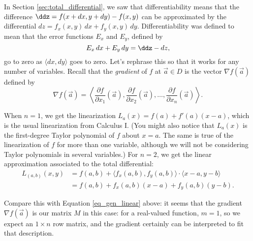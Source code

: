 In Section \ref{sec:total_differential}, we saw that differentiability means that the difference $\ddz = f(x+dx,y+dy) - f(x,y)$ can be approximated by the differential $dz = f_x(x,y)\,dx+f_y(x,y)\,dy$. Differentiability was defined to mean that the error functions $E_x$ and $E_y$, defined by
\[
E_x\,dx+E_y\,dy = \ddz -dz,
\]
go to zero as $\langle dx,dy\rangle$ goes to zero. Let's rephrase this so that it works for any number of variables. Recall that the  \emph{gradient} of $f$ at $\vec{a}\in D$ is the vector $\nabla f(\vec{a})$ defined by
 \[
 \nabla f(\vec{a}) = \left< \frac{\partial f}{\partial x_1}(\vec{a}),\frac{\partial f}{\partial x_2}(\vec{a}),\ldots, \frac{\partial f}{\partial x_n}(\vec{a})\right>.
 \]

When $n=1$, we get the linearization $L_a(x) = f(a)+f'(a)(x-a)$, which is the usual linearization from Calculus I. (You might also notice that $L_a(x)$ is the first-degree Taylor polynomial of $f$ about $x=a$. The same is true of the linearization of $f$ for more than one variable, although we will not be considering Taylor polynomials in several variables.) For $n=2$, we get the linear approximation associated to the total differential:
\begin{align*}
L_{(a,b)}(x,y) &= f(a,b)+\langle f_x(a,b),f_y(a,b)\rangle\cdot \langle x-a,y-b\rangle\\
& = f(a,b) + f_x(a,b)(x-a)+f_y(a,b)(y-b).
\end{align*}


Compare this with Equation \eqref{eq_gen_linear} above: it seems that the gradient $\nabla f (\vec{a})$ is our matrix $M$ in this case: for a real-valued function, $m=1$, so we expect an $1\times n$ row matrix, and the gradient certainly can be interpreted to fit that description.


